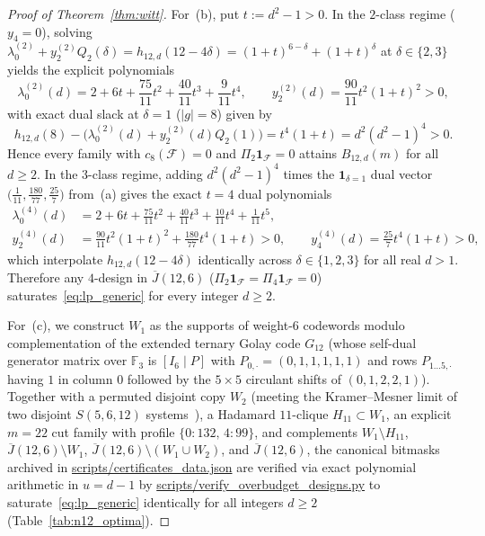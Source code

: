 \documentclass[11pt,reqno]{amsart}
\theoremstyle{definition}
\theoremstyle{remark}
\newcommand{\Jbar}{\overline{J}}
\newcommand{\F}{\mathcal{F}}
\begin{document}
\begin{proof}[Proof of Theorem~\ref{thm:witt}]
For~(b), put $t := d^2 - 1 > 0$. In the $2$-class regime ($y_4 = 0$), solving $\lambda_0^{(2)} + y_2^{(2)} Q_2(\delta) = h_{12,d}(12 - 4\delta) = (1+t)^{6-\delta} + (1+t)^{\delta}$ at $\delta \in \{2,3\}$ yields the explicit polynomials
\[
\lambda_0^{(2)}(d) = 2 + 6t + \frac{75}{11}t^2 + \frac{40}{11}t^3 + \frac{9}{11}t^4, \qquad y_2^{(2)}(d) = \frac{90}{11} t^2 (1 + t)^2 > 0,
\]
with exact dual slack at $\delta = 1$ ($|g| = 8$) given by
\[
h_{12,d}(8) - \bigl(\lambda_0^{(2)}(d) + y_2^{(2)}(d) Q_2(1)\bigr) = t^4(1+t) = d^2(d^2 - 1)^4 > 0.
\]
Hence every family with $c_8(\F) = 0$ and $\Pi_2 \mathbf{1}_{\F} = 0$ attains $B_{12,d}(m)$ for all $d \ge 2$. In the $3$-class regime, adding $d^2(d^2-1)^4$ times the $\mathbf{1}_{\delta=1}$ dual vector $\bigl(\frac{1}{11}, \frac{180}{77}, \frac{25}{7}\bigr)$ from~(a) gives the exact $t=4$ dual polynomials
\begin{align*}
\lambda_0^{(4)}(d) &= 2 + 6t + \frac{75}{11}t^2 + \frac{40}{11}t^3 + \frac{10}{11}t^4 + \frac{1}{11}t^5,\\
y_2^{(4)}(d) &= \frac{90}{11}t^2(1+t)^2 + \frac{180}{77}t^4(1+t) > 0, \qquad y_4^{(4)}(d) = \frac{25}{7}t^4(1+t) > 0,
\end{align*}
which interpolate $h_{12,d}(12-4\delta)$ identically across $\delta \in \{1,2,3\}$ for all real $d > 1$. Therefore any $4$-design in $\Jbar(12,6)$ ($\Pi_2\mathbf{1}_{\F} = \Pi_4\mathbf{1}_{\F} = 0$) saturates~\eqref{eq:lp_generic} for every integer $d \ge 2$.

For~(c), we construct $W_1$ as the supports of weight-$6$ codewords modulo complementation of the extended ternary Golay code $G_{12}$ (whose self-dual generator matrix over $\mathbb{F}_3$ is $[I_6 \mid P]$ with $P_{0,\cdot} = (0,1,1,1,1,1)$ and rows $P_{1\dots 5,\cdot}$ having $1$ in column $0$ followed by the $5 \times 5$ circulant shifts of $(0,1,2,2,1)$). Together with a permuted disjoint copy $W_2$ (meeting the Kramer--Mesner limit of two disjoint $S(5,6,12)$ systems~\cite{KramerMesner1974}), a Hadamard $11$-clique $H_{11} \subset W_1$, an explicit $m=22$ cut family with profile $\{0:132,\, 4:99\}$, and complements $W_1 \setminus H_{11}$, $\Jbar(12,6) \setminus W_1$, $\Jbar(12,6) \setminus (W_1 \cup W_2)$, and $\Jbar(12,6)$, the canonical bitmasks archived in \url{scripts/certificates_data.json} are verified via exact polynomial arithmetic in $u = d - 1$ by \url{scripts/verify_overbudget_designs.py} to saturate~\eqref{eq:lp_generic} identically for all integers $d \ge 2$ (Table~\ref{tab:n12_optima}).
\end{proof}
\end{document}
